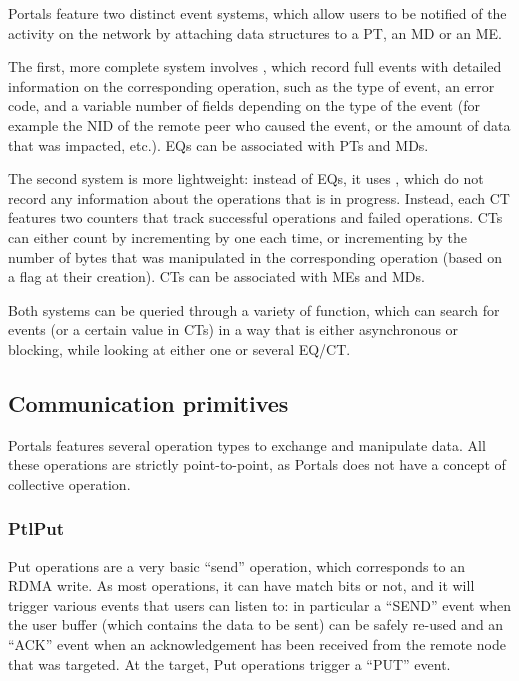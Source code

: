 Portals feature two distinct event systems, which allow users to be notified of
the activity on the network by attaching data structures to a PT, an MD or an
ME.

The first, more complete system involves , which
record full events with detailed information on the corresponding operation,
such as the type of event, an error code, and a variable number of fields
depending on the type of the event (for example the NID of the remote peer who
caused the event, or the amount of data that was impacted, etc.). EQs can be
associated with PTs and MDs.

The second system is more lightweight: instead of EQs, it uses
, which do not record any information about the
operations that is in progress. Instead, each CT features two counters that
track successful operations and failed operations. CTs can either count by
incrementing by one each time, or incrementing by the number of bytes that was
manipulated in the corresponding operation (based on a flag at their creation).
CTs can be associated with MEs and MDs.

Both systems can be queried through a variety of function, which can search for
events (or a certain value in CTs) in a way that is either asynchronous or
blocking, while looking at either one or several EQ/CT.\newline

\subsection{Communication primitives}

Portals features several operation types to exchange and manipulate data. All
these operations are strictly point-to-point, as Portals does not have a concept
of collective operation.

\subsubsection{PtlPut}

Put operations are a very basic ``send'' operation, which corresponds to an RDMA
write. As most operations, it can have match bits or not, and it will trigger
various events that users can listen to: in particular a ``SEND'' event when the
user buffer (which contains the data to be sent) can be safely re-used and an
``ACK'' event when an acknowledgement has been received from the remote node
that was targeted. At the target, Put operations trigger a ``PUT'' event.

